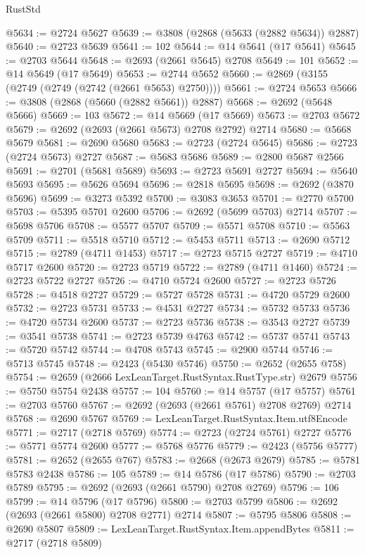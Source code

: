\begin{lexlean}{RustStd}
\begin{coremodule}
@5634 := @2724 @5627
@5639 := @3808 (@2868 (@5633 (@2882 @5634)) @2887)
@5640 := @2723 @5639
@5641 := 102
@5644 := @14 @5641 (@17 @5641)
@5645 := @2703 @5644
@5648 := @2693 (@2661 @5645) @2708
@5649 := 101
@5652 := @14 @5649 (@17 @5649)
@5653 := @2744 @5652
@5660 := @2869 (@3155 (@2749 (@2749 (@2742 (@2661 @5653) @2750))))
@5661 := @2724 @5653
@5666 := @3808 (@2868 (@5660 (@2882 @5661)) @2887)
@5668 := @2692 (@5648 @5666)
@5669 := 103
@5672 := @14 @5669 (@17 @5669)
@5673 := @2703 @5672
@5679 := @2692 (@2693 (@2661 @5673) @2708 @2792) @2714
@5680 := @5668 @5679
@5681 := @2690 @5680
@5683 := @2723 (@2724 @5645)
@5686 := @2723 (@2724 @5673) @2727
@5687 := @5683 @5686
@5689 := @2800 @5687 @2566
@5691 := @2701 (@5681 @5689)
@5693 := @2723 @5691 @2727
@5694 := @5640 @5693
@5695 := @5626 @5694
@5696 := @2818 @5695
@5698 := @2692 (@3870 @5696)
@5699 := @3273 @5392
@5700 := @3083 @3653
@5701 := @2770 @5700
@5703 := @5395 @5701 @2600
@5706 := @2692 (@5699 @5703) @2714
@5707 := @5698 @5706
@5708 := @5577 @5707
@5709 := @5571 @5708
@5710 := @5563 @5709
@5711 := @5518 @5710
@5712 := @5453 @5711
@5713 := @2690 @5712
@5715 := @2789 (@4711 @1453)
@5717 := @2723 @5715 @2727
@5719 := @4710 @5717 @2600
@5720 := @2723 @5719
@5722 := @2789 (@4711 @1460)
@5724 := @2723 @5722 @2727
@5726 := @4710 @5724 @2600
@5727 := @2723 @5726
@5728 := @4518 @2727
@5729 := @5727 @5728
@5731 := @4720 @5729 @2600
@5732 := @2723 @5731
@5733 := @4531 @2727
@5734 := @5732 @5733
@5736 := @4720 @5734 @2600
@5737 := @2723 @5736
@5738 := @3543 @2727
@5739 := @3541 @5738
@5741 := @2723 @5739 @4763
@5742 := @5737 @5741
@5743 := @5720 @5742
@5744 := @4708 @5743
@5745 := @2900 @5744
@5746 := @5713 @5745
@5748 := @2423 (@5430 @5746)
@5750 := @2652 (@2655 @758)
@5754 := @2659 (@2666 LexLeanTarget.RustSyntax.RustType.str) @2679
@5756 := @5750 @5754 @2438
@5757 := 104
@5760 := @14 @5757 (@17 @5757)
@5761 := @2703 @5760
@5767 := @2692 (@2693 (@2661 @5761) @2708 @2769) @2714
@5768 := @2690 @5767
@5769 := LexLeanTarget.RustSyntax.Item.utf8Encode
@5771 := @2717 (@2718 @5769)
@5774 := @2723 (@2724 @5761) @2727
@5776 := @5771 @5774 @2600
@5777 := @5768 @5776
@5779 := @2423 (@5756 @5777)
@5781 := @2652 (@2655 @767)
@5783 := @2668 (@2673 @2679)
@5785 := @5781 @5783 @2438
@5786 := 105
@5789 := @14 @5786 (@17 @5786)
@5790 := @2703 @5789
@5795 := @2692 (@2693 (@2661 @5790) @2708 @2769)
@5796 := 106
@5799 := @14 @5796 (@17 @5796)
@5800 := @2703 @5799
@5806 := @2692 (@2693 (@2661 @5800) @2708 @2771) @2714
@5807 := @5795 @5806
@5808 := @2690 @5807
@5809 := LexLeanTarget.RustSyntax.Item.appendBytes
@5811 := @2717 (@2718 @5809)

\end{coremodule}
\end{lexlean}
